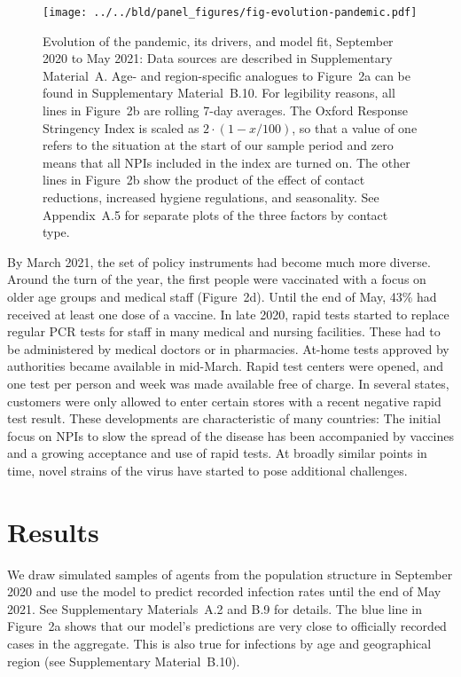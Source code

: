 \documentclass[fleqn,10pt]{wlscirep}
\begin{document}
\begin{figure}[tb]
    \centering
    \texttt{[image: ../../bld/panel\_figures/fig-evolution-pandemic.pdf]}
    \caption{
        Evolution of the pandemic, its drivers, and model fit, September 2020 to May
        2021: Data sources are described in Supplementary Material~A. Age- and
        region-specific analogues to Figure~2a can be found in Supplementary
        Material~B.10. For legibility reasons, all lines in Figure~2b are rolling 7-day
        averages. The Oxford Response Stringency Index is scaled as $2 \cdot (1 -  x /
        100)$, so that a value of one refers to the situation at the start of our sample
        period and zero means that all NPIs included in the index are turned on. The
        other lines in Figure~2b show the product of the effect of contact reductions,
        increased hygiene regulations, and seasonality. See Appendix~A.5 for separate
        plots of the three factors by contact type.
    }
    \label{fig:pandemic_drivers_model_fit}
\end{figure}

By March 2021, the set of policy instruments had become much more diverse. Around the
turn of the year, the first people were vaccinated with a focus on older age groups and
medical staff (Figure~2d). Until the end of May, 43\% had received at least one dose of
a vaccine. In late 2020, rapid tests started to replace regular PCR tests for staff in
many medical and nursing facilities. These had to be administered by medical doctors or
in pharmacies. At-home tests approved by authorities became available in mid-March.
Rapid test centers were opened, and one test per person and week was made available free
of charge. In several states, customers were only allowed to enter certain stores with a
recent negative rapid test result. These developments are characteristic of many
countries: The initial focus on NPIs to slow the spread of the disease has been
accompanied by vaccines and a growing acceptance and use of rapid tests. At broadly
similar points in time, novel strains of the virus have started to pose additional
challenges.


\section*{Results}

We draw simulated samples of agents from the population structure in September 2020 and
use the model to predict recorded infection rates until the end of May 2021. See
Supplementary Materials~A.2 and B.9 for details. The blue line in
Figure~2a shows that our model's predictions are very close to
officially recorded cases in the aggregate. This is also true for infections by age and
geographical region (see Supplementary Material~B.10).
\end{document}
